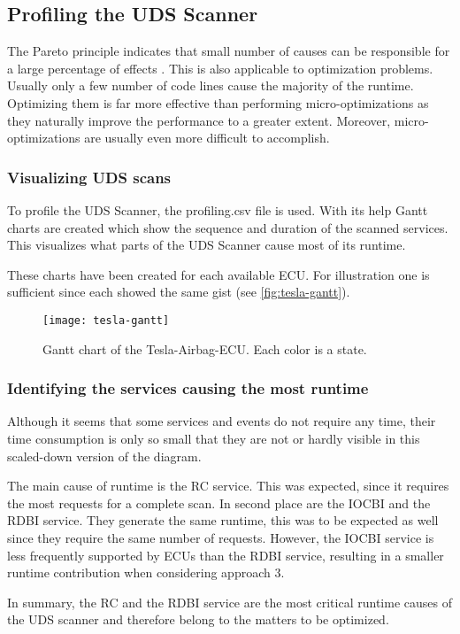 \subsection{Profiling the UDS Scanner}

The Pareto principle indicates that small number of causes can be responsible for a large percentage of effects \cite{pareto}. This is also applicable to optimization problems. Usually only a few number of code lines cause the majority of the runtime. Optimizing them is far more effective than performing micro-optimizations as they naturally improve the performance to a greater extent. Moreover, micro-optimizations are usually even more difficult to accomplish.

\subsubsection{Visualizing UDS scans}

To profile the UDS Scanner, the profiling.csv file is used. With its help Gantt charts are created which show the sequence and duration of the scanned services. This visualizes what parts of the UDS Scanner cause most of its runtime.

These charts have been created for each available ECU. For illustration one is sufficient since each showed the same gist (see \autoref{fig:tesla-gantt}).

\begin{figure}[H]
    \centering
    \texttt{[image: tesla-gantt]}
    \caption{Gantt chart of the Tesla-Airbag-ECU. Each color is a state.}
    \label{fig:tesla-gantt}
\end{figure}


\subsubsection{Identifying the services causing the most runtime}

Although it seems that some services and events do not require any time, their time consumption is only so small that they are not or hardly visible in this scaled-down version of the diagram.

The main cause of runtime is the RC service. This was expected, since it requires the most requests for a complete scan.
In second place are the IOCBI and the RDBI service. They generate the same runtime, this was to be expected as well since they require the same number of requests. However, the IOCBI service is less frequently supported by ECUs than the RDBI service, resulting in a smaller runtime contribution when considering approach 3.

In summary, the RC and the RDBI service are the most critical runtime causes of the UDS scanner and therefore belong to the matters to be optimized.

